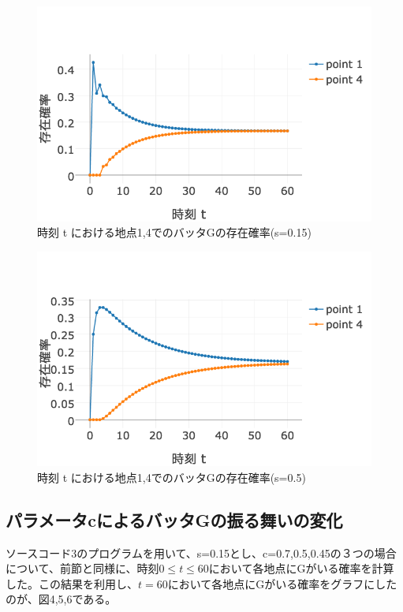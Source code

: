 \documentclass[11pt]{ltjsarticle}
\begin{document}
\begin{figure}
  \includegraphics[width=\textwidth]{fig2.png}
  \caption{時刻 t における地点1,4でのバッタGの存在確率(s=0.15)}
\end{figure}

\begin{figure}
  \includegraphics[width=\textwidth]{fig3.png}
  \caption{時刻 t における地点1,4でのバッタGの存在確率(s=0.5)}
\end{figure}

\subsection{パラメータcによるバッタGの振る舞いの変化}
	ソースコード3のプログラムを用いて、s=0.15とし、c=0.7,0.5,0.45の３つの場合について、前節と同様に、時刻$0 \leq t \leq 60$において各地点にGがいる確率を計算した。この結果を利用し、$t=60$において各地点にGがいる確率をグラフにしたのが、図4,5,6である。
\end{document}
